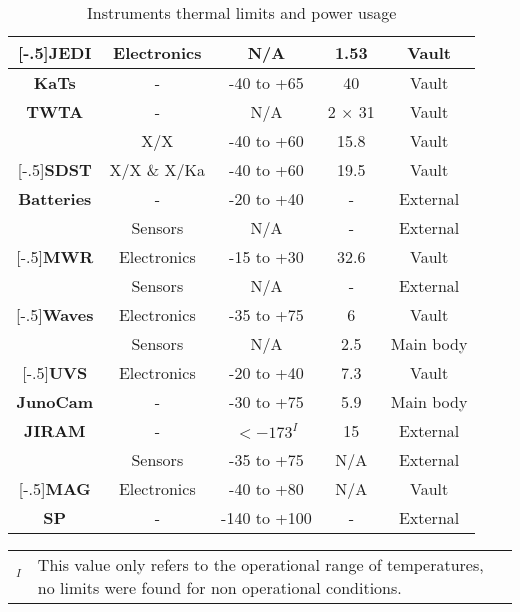 \begin{table}[H]
\begin{tabular}{|c||c|c|c|c|}
        \hhline{|~|-|-|-|-|}
        \multirow{-2}{*}[-.5\arrayrulewidth]{\textbf{JEDI} \cite{JEDI_info}} &  Electronics & N/A & 1.53 & Vault \\
        \hline
        \textbf{KaTs} \cite{KaTs_info} & - & -40 to +65 & 40 & Vault \\
        \hline
        \textbf{TWTA} & - & N/A & 2 $\times$ 31 & Vault \\
        \hline
        & X/X & -40 to +60 & 15.8 & Vault \\
        \hhline{|~|-|-|-|-|}
        \multirow{-2}{*}[-.5\arrayrulewidth]{\textbf{SDST} \cite{SDST_info}} & X/X \& X/Ka & -40 to +60 & 19.5 & Vault \\
        \hline
        \textbf{Batteries} \cite{batteries_info} & - & -20 to +40 & - & External \\
        \hline
        & Sensors & N/A & - & External \\
        \hhline{|~|-|-|-|-|}
        \multirow{-2}{*}[-.5\arrayrulewidth]{\textbf{MWR} \cite{MWR_info}} & Electronics & -15 to +30 & 32.6 & Vault \\
        \hline
        & Sensors & N/A & - & External \\
        \hhline{|~|-|-|-|-|}
        \multirow{-2}{*}[-.5\arrayrulewidth]{\textbf{Waves} \cite{Waves_info}} & Electronics & -35 to +75 & 6 & Vault \\
        \hline
        & Sensors & N/A & 2.5 & Main body \\
        \hhline{|~|-|-|-|-|}
        \multirow{-2}{*}[-.5\arrayrulewidth]{\textbf{UVS} \cite{UVS_info}} & Electronics & -20 to +40 & 7.3 & Vault \\
        \hline
        \textbf{JunoCam} \cite{JunoCam_info} & - & -30 to +75 & 5.9 & Main body \\
        \hline
        \textbf{JIRAM} \cite{JIRAM_info} & - & $<-173^I$ & 15 & External \\
        \hline
        & Sensors & -35 to +75 & N/A & External \\
        \hhline{|~|-|-|-|-|}
        \multirow{-2}{*}[-.5\arrayrulewidth]{\textbf{MAG} \cite{MAG_info}} & Electronics & -40 to +80 & N/A & Vault \\
        \hline
        \textbf{SP} \cite{solar_panels_coef}& - & -140 to +100 & - & External \\
        \hline
    \end{tabular}
    \caption{Instruments thermal limits and power usage}
    \label{table:thermal_limits}
\end{table}

\begin{small}
\begin{tabular}{ll}
    $^I$ & This value only refers to the operational range of temperatures, no limits were found for non operational conditions.
\end{tabular}
\end{small}